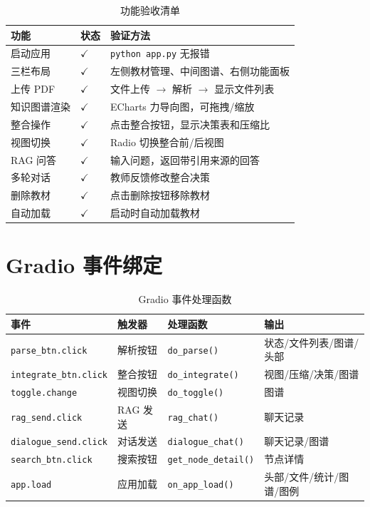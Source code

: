 \documentclass[12pt,a4paper]{article}
\newcommand{\faCheck}{$\checkmark$}
\begin{document}
\begin{table}[H]
\centering
\caption{功能验收清单}
\begin{tabularx}{\textwidth}{llX}
\toprule
\textbf{功能} & \textbf{状态} & \textbf{验证方法} \\
\midrule
启动应用 & \faCheck & \texttt{python app.py} 无报错 \\
三栏布局 & \faCheck & 左侧教材管理、中间图谱、右侧功能面板 \\
上传 PDF & \faCheck & 文件上传 $\to$ 解析 $\to$ 显示文件列表 \\
知识图谱渲染 & \faCheck & ECharts 力导向图，可拖拽/缩放 \\
整合操作 & \faCheck & 点击整合按钮，显示决策表和压缩比 \\
视图切换 & \faCheck & Radio 切换整合前/后视图 \\
RAG 问答 & \faCheck & 输入问题，返回带引用来源的回答 \\
多轮对话 & \faCheck & 教师反馈修改整合决策 \\
删除教材 & \faCheck & 点击删除按钮移除教材 \\
自动加载 & \faCheck & 启动时自动加载教材 \\
\bottomrule
\end{tabularx}
\end{table}

\section{Gradio 事件绑定}
\label{sec:events}

\begin{table}[H]
\centering
\caption{Gradio 事件处理函数}
\begin{tabularx}{\textwidth}{lllX}
\toprule
\textbf{事件} & \textbf{触发器} & \textbf{处理函数} & \textbf{输出} \\
\midrule
\texttt{parse\_btn.click} & 解析按钮 & \texttt{do\_parse()} & 状态/文件列表/图谱/头部 \\
\texttt{integrate\_btn.click} & 整合按钮 & \texttt{do\_integrate()} & 视图/压缩/决策/图谱 \\
\texttt{toggle.change} & 视图切换 & \texttt{do\_toggle()} & 图谱 \\
\texttt{rag\_send.click} & RAG 发送 & \texttt{rag\_chat()} & 聊天记录 \\
\texttt{dialogue\_send.click} & 对话发送 & \texttt{dialogue\_chat()} & 聊天记录/图谱 \\
\texttt{search\_btn.click} & 搜索按钮 & \texttt{get\_node\_detail()} & 节点详情 \\
\texttt{app.load} & 应用加载 & \texttt{on\_app\_load()} & 头部/文件/统计/图谱/图例 \\
\bottomrule
\end{tabularx}
\end{table}
\end{document}
